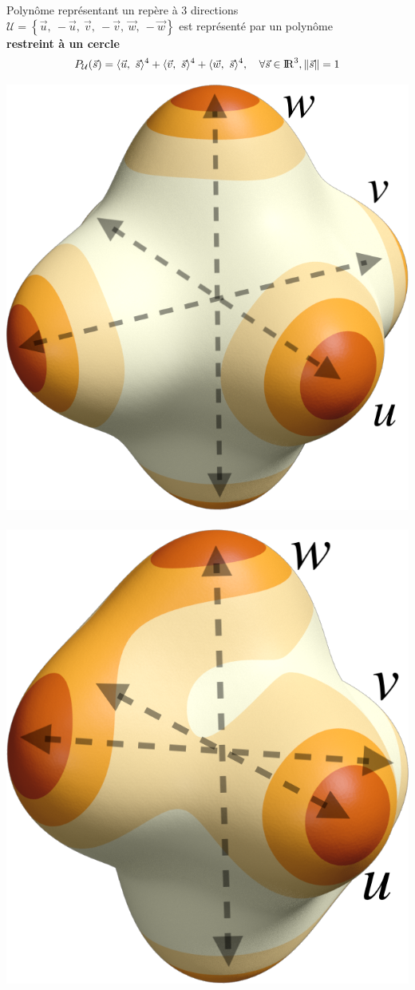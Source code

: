 \documentclass{beamer}
\begin{document}
\begin{frame}{Polynôme représentant un repère à 3 directions}
    \centering
    \small
    $\mathcal{U} = \left\{\vec{u},\ -\vec{u},\ \vec{v},\ -\vec{v},\ \vec{w},\ -\vec{w}\right\}$ est représenté par un polynôme \\
    \textbf{restreint à un cercle}
    $$ P_\mathcal{U}(\vec{s}) = \langle \vec{u},\ \vec{s}\rangle^{4} +  \langle \vec{v},\ \vec{s}\rangle^{4} +  \langle \vec{w},\ \vec{s}\rangle^{4}, \ \ \   \forall \vec{s} \in {\rm I\!R}^3, \lVert \vec{s} \rVert = 1$$
    
    \vspace*{.5\baselineskip}
    \includegraphics[width=0.33\linewidth]{img_spm_ff/sperical_3dir4.png}
    \ \ \ \ \ \ \ \ \ \ \ 
    \includegraphics[width=0.3\linewidth]{img_spm_ff/sperical_3dir4_rot.png}
\end{frame} 
\end{document}
